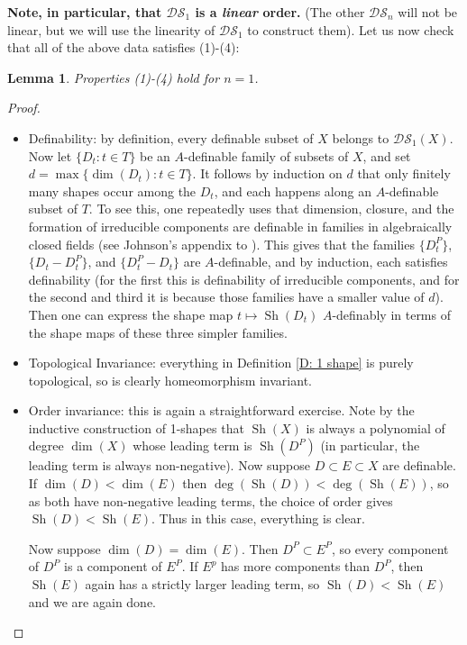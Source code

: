 \documentclass{amsart}
\newtheorem{lemma}[theorem]{Lemma}
\theoremstyle{definition}
\begin{document}
\textbf{Note, in particular, that $\mathcal{DS}_1$ is a \textit{linear} order.} (The other $\mathcal{DS}_n$ will not be linear, but we will use the linearity of $\mathcal{DS}_1$ to construct them). Let us now check that all of the above data satisfies (1)-(4):



\begin{lemma}
    Properties (1)-(4) hold for $n=1$.
\end{lemma}

\begin{proof}
    \begin{itemize}
    \item Definability: by definition, every definable subset of $X$ belongs to $\mathcal{DS}_1(X)$. Now let $\{D_t:t\in T\}$ be an $A$-definable family of subsets of $X$, and set $d=\max\{\dim(D_t):t\in T\}$. It follows by induction on $d$ that only finitely many shapes occur among the $D_t$, and each happens along an $A$-definable subset of $T$. To see this, one repeatedly uses that dimension, closure, and the formation of irreducible components are definable in families in algebraically closed fields (see Johnson's appendix to \cite{JohIrr}). This gives that the families $\{D_t^P\}$, $\{D_t-D_t^P\}$, and $\{D_t^P-D_t\}$ are $A$-definable, and by induction, each satisfies definability (for the first this is definability of irreducible components, and for the second and third it is because those families have a smaller value of $d$). Then one can express the shape map $t\mapsto\operatorname{Sh}(D_t)$ $A$-definably in terms of the shape maps of these three simpler families.
    \item Topological Invariance: everything in Definition \ref{D: 1 shape} is purely topological, so is clearly homeomorphism invariant.
    \item Order invariance: this is again a straightforward exercise. Note by the inductive construction of 1-shapes that $\operatorname{Sh}(X)$ is always a polynomial of degree $\dim(X)$ whose leading term is $\operatorname{Sh}(D^P)$ (in particular, the leading term is always non-negative). Now suppose $D\subset E\subset X$ are definable. If $\dim(D)<\dim(E)$ then $\deg(\operatorname{Sh}(D))<\deg(\operatorname{Sh}(E))$, so as both have non-negative leading terms, the choice of order gives $\operatorname{Sh}(D)<\operatorname{Sh}(E)$. Thus in this case, everything is clear.
    
    Now suppose $\dim(D)=\dim(E)$. Then $D^P\subset E^P$, so every component of $D^P$ is a component of $E^P$. If $E^p$ has more components than $D^P$, then $\operatorname{Sh}(E)$ again has a strictly larger leading term, so $\operatorname{Sh}(D)<\operatorname{Sh}(E)$ and we are again done.
    

\end{itemize}
\end{proof}
\end{document}
